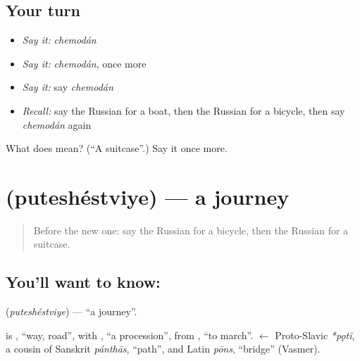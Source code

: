 \subsection*{Your turn}
\begin{itemize}
\raggedright
  \item \emph{Say it:} \emph{chemodán}
  \item \emph{Say it:} \emph{chemodán}, once more
  \item \emph{Say it:} say \emph{chemodán}
  \item \emph{Recall:} say the Russian for a boat, then the Russian for a bicycle, then say \emph{chemodán} again
\end{itemize}

\begin{tcolorbox}[breakable,colback=teal!4,colframe=teal!35!black,title={Before you move on}]
What does  mean? (\textquotedblleft{}A suitcase\textquotedblright{}.) Say it once more.
\end{tcolorbox}
\section[\texorpdfstring{\ru{путешествие} (puteshéstviye)}{путешествие (puteshéstviye)}]{ (puteshéstviye) — a journey}

\label{lesson:RU-C92-journey}



\begin{quote}
Before the new one: say the Russian for a bicycle, then the Russian for a suitcase.
\end{quote}

\subsection*{You'll want to know: }
\textbf{} (\emph{puteshéstviye}) — \textquotedblleft{}a journey\textquotedblright{}.

\begin{cousinweb}
\textbf{} is \emph{}, \textquotedblleft{}way, road\textquotedblright{}, with \emph{}, \textquotedblleft{}a procession\textquotedblright{}, from \emph{}, \textquotedblleft{}to march\textquotedblright{}. \emph{} $\leftarrow$ Proto-Slavic \emph{*pǫtĭ}, a cousin of Sanskrit \emph{pánthās}, \textquotedblleft{}path\textquotedblright{}, and Latin \emph{pōns}, \textquotedblleft{}bridge\textquotedblright{} (Vasmer).
\end{cousinweb}

